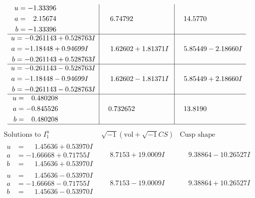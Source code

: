 \documentclass[1p]{elsarticle_modified}
\theoremstyle{definition}
\newcommand{\I}{\sqrt{-1}}
\begin{document}
$$\begin{array}{c|c|c}
\begin{aligned}
u &= -1.33396\phantom{ +0.000000I} \\
a &= \phantom{-}2.15674\phantom{ +0.000000I} \\
b &= -1.33396\phantom{ +0.000000I}\end{aligned}
 & \phantom{-}6.74792\phantom{ +0.000000I} & \phantom{-}14.5770\phantom{ +0.000000I} \\ \hline\begin{aligned}
u &= -0.261143 + 0.528763 I \\
a &= -1.18448 + 0.94699 I \\
b &= -0.261143 + 0.528763 I\end{aligned}
 & \phantom{-}1.62602 + 1.81371 I & \phantom{-}5.85449 - 2.18660 I \\ \hline\begin{aligned}
u &= -0.261143 - 0.528763 I \\
a &= -1.18448 - 0.94699 I \\
b &= -0.261143 - 0.528763 I\end{aligned}
 & \phantom{-}1.62602 - 1.81371 I & \phantom{-}5.85449 + 2.18660 I \\ \hline\begin{aligned}
u &= \phantom{-}0.480208\phantom{ +0.000000I} \\
a &= -0.845526\phantom{ +0.000000I} \\
b &= \phantom{-}0.480208\phantom{ +0.000000I}\end{aligned}
 & \phantom{-}0.732652\phantom{ +0.000000I} & \phantom{-}13.8190\phantom{ +0.000000I}\\
 \hline 
 \end{array}$$\newpage$$\begin{array}{c|c|c}  
\text{Solutions to }I^u_{1}& \I (\text{vol} + \sqrt{-1}CS) & \text{Cusp shape}\\
 \hline 
\begin{aligned}
u &= \phantom{-}1.45636 + 0.53970 I \\
a &= -1.66668 + 0.71755 I \\
b &= \phantom{-}1.45636 + 0.53970 I\end{aligned}
 & \phantom{-}8.7153 + 19.0009 I & \phantom{-}9.38864 - 10.26527 I \\ \hline\begin{aligned}
u &= \phantom{-}1.45636 - 0.53970 I \\
a &= -1.66668 - 0.71755 I \\
b &= \phantom{-}1.45636 - 0.53970 I\end{aligned}
 & \phantom{-}8.7153 - 19.0009 I & \phantom{-}9.38864 + 10.26527 I \\ \hline\begin{aligned}

\end{aligned}
\end{array}$$
\end{document}
